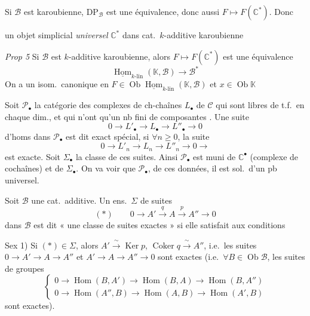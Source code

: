 \documentclass[11pt,a4paper]{article}
\begin{document}
Si $\mathcal{B}$ est karoubienne, $\mathrm{DP}_{\mathcal{B}}$ est une équivalence, donc aussi
$F \mapsto F(\mathbb{C}^{*})$. Donc

\ill{} \ill{} un objet simplicial \emph{universel}
$\mathbb{C}^{*}$  \ill{} dans cat.\ $k$-additive karoubienne

\emph{Prop 5} Si $\mathcal{B}$ est $k$-additive karoubienne, alors
$F \mapsto F(\mathbb{C}^{*})$ est une équivalence
\[
\underline{\operatorname{Hom}}_{k\text{-lin}}(\mathbb{K}, \mathcal{B}) \longrightarrow \mathcal{B}^{*}
\]
On a un isom.\ canonique  en
$F \in \operatorname{Ob} \underline{\operatorname{Hom}}_{k\text{-lin}}(\mathbb{K}, \mathcal{B})$ et $x \in \operatorname{Ob} \mathbb{K}$

Soit $\mathcal{P}_{\bullet}$ la catégorie des complexes de ch-chaînes $L_{\bullet}$ de
$\mathcal{C}$ qui sont libres de t.f.\ en chaque dim., et qui n'ont qu'un nb fini de
composantes . Une suite
\[
0 \to L'_{\bullet} \to L_{\bullet} \to L''_{\bullet} \to 0
\]
d'homs dans $\mathcal{P}_{\bullet}$ est dit exact spécial, si $\forall n \geqslant 0$, la suite
\[
0 \to L'_n \to L_n \to L''_n \to 0 \longrightarrow
\]
est exacte. Soit $\Sigma_{\bullet}$ la classe de ces suites. Ainsi $\mathcal{P}_{\bullet}$ est muni de
$\mathbb{C}^{\bullet}$ (complexe de cochaînes) et de $\Sigma_{\bullet}$. On va voir que
$\mathcal{P}_{\bullet}$,  de ces données, il est sol.\ d'un pb universel.

 Soit $\mathcal{B}$ une cat.\ additive. Un ens.\ $\Sigma$ de suites
\[
(*) \qquad 0 \to A' \xrightarrow{\ q\ } A \xrightarrow{\ p\ } A'' \to 0
\]
dans $\mathcal{B}$ est dit « une classe de suites exactes » si elle satisfait aux conditions

Sex 1) Si $(*) \in \Sigma$, alors $A' \xrightarrow{\ \sim\ } \operatorname{Ker} p$,
$\operatorname{Coker} q \xrightarrow{\ \sim\ } A''$, i.e.\ les suites
$0 \to A' \to A \to A''$ et $A' \to A \to A'' \to 0$ sont exactes (i.e.\
$\forall B \in \operatorname{Ob} \mathcal{B}$, les suites de groupes
\[
\left\lbrace
\begin{array}{l}
0 \to \operatorname{Hom}(B, A') \to \operatorname{Hom}(B, A) \to \operatorname{Hom}(B, A'') \\
0 \to \operatorname{Hom}(A'', B) \to \operatorname{Hom}(A, B) \to \operatorname{Hom}(A', B)
\end{array}
\right.
\]
sont exactes).
\end{document}
